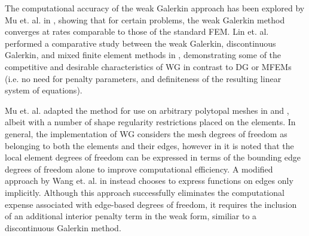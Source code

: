 	The computational accuracy of the weak Galerkin approach has been explored by Mu et. al. in \cite{Mu:13}, showing that for certain problems, the weak Galerkin method converges at rates comparable to those of the standard FEM. Lin et. al. performed a comparative study between the weak Galerkin, discontinuous Galerkin, and mixed finite element methods in \cite{Lin:15}, demonstrating some of the competitive and desirable characteristics of WG in contrast to DG or MFEMs (i.e. no need for penalty parameters, and definiteness of the resulting linear system of equations).

	Mu et. al. adapted the method for use on arbitrary polytopal meshes in \cite{Mu:15:2} and \cite{Mu:15:1}, albeit with a number of shape regularity restrictions placed on the elements. In general, the implementation of WG considers the mesh degrees of freedom as belonging to both the elements and their edges, however in \cite{Mu:15:1} it is noted that the local element degrees of freedom can be expressed in terms of the bounding edge degrees of freedom alone to improve computational efficiency. A modified approach by Wang et. al. in \cite{Wang:14} instead chooses to express functions on edges only implicitly. Although this approach successfully eliminates the computational expense associated with edge-based degrees of freedom, it requires the inclusion of an additional interior penalty term in the weak form, similiar to a discontinuous Galerkin method.

